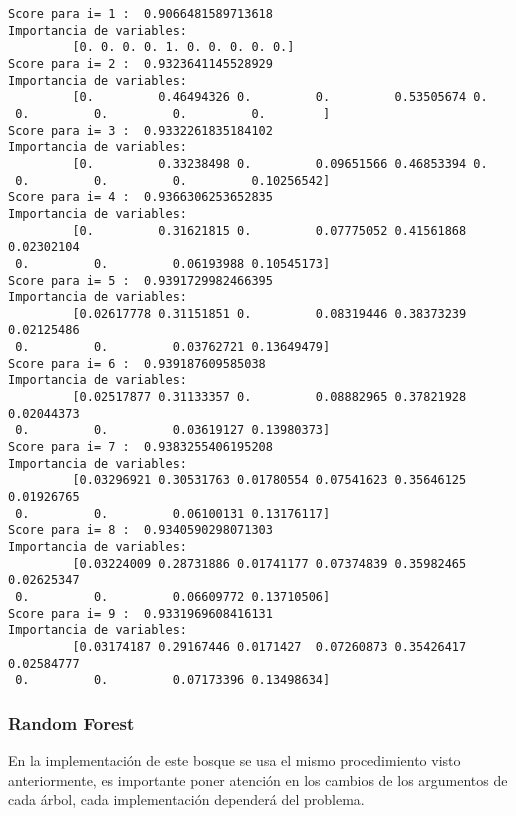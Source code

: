 \documentclass[11pt]{article}
\begin{document}
    \begin{Verbatim}[commandchars=\\\{\}]
Score para i= 1 :  0.9066481589713618
Importancia de variables:
         [0. 0. 0. 0. 1. 0. 0. 0. 0. 0.]
Score para i= 2 :  0.9323641145528929
Importancia de variables:
         [0.         0.46494326 0.         0.         0.53505674 0.
 0.         0.         0.         0.        ]
Score para i= 3 :  0.9332261835184102
Importancia de variables:
         [0.         0.33238498 0.         0.09651566 0.46853394 0.
 0.         0.         0.         0.10256542]
Score para i= 4 :  0.9366306253652835
Importancia de variables:
         [0.         0.31621815 0.         0.07775052 0.41561868 0.02302104
 0.         0.         0.06193988 0.10545173]
Score para i= 5 :  0.9391729982466395
Importancia de variables:
         [0.02617778 0.31151851 0.         0.08319446 0.38373239 0.02125486
 0.         0.         0.03762721 0.13649479]
Score para i= 6 :  0.939187609585038
Importancia de variables:
         [0.02517877 0.31133357 0.         0.08882965 0.37821928 0.02044373
 0.         0.         0.03619127 0.13980373]
Score para i= 7 :  0.9383255406195208
Importancia de variables:
         [0.03296921 0.30531763 0.01780554 0.07541623 0.35646125 0.01926765
 0.         0.         0.06100131 0.13176117]
Score para i= 8 :  0.9340590298071303
Importancia de variables:
         [0.03224009 0.28731886 0.01741177 0.07374839 0.35982465 0.02625347
 0.         0.         0.06609772 0.13710506]
Score para i= 9 :  0.9331969608416131
Importancia de variables:
         [0.03174187 0.29167446 0.0171427  0.07260873 0.35426417 0.02584777
 0.         0.         0.07173396 0.13498634]
    \end{Verbatim}

    \hypertarget{random-forest}{%
\subsubsection{Random Forest}\label{random-forest}}

En la implementación de este bosque se usa el mismo procedimiento visto
anteriormente, es importante poner atención en los cambios de los
argumentos de cada árbol, cada implementación dependerá del problema.
\end{document}

